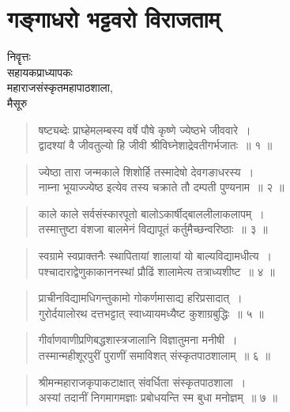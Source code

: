 \chapter{गङ्गाधरो भट्टवरो विराजताम्}

\begin{center}
\smallskip

निवॄत्तः\\ 
सहायकप्राध्यापकः\\ 
महाराजसंस्कृतमहापाठशाला,\\ 
मैसूरु
\addrule
\end{center}

\begin{verse}
षष्ट्यब्देः प्राघ्हेमलम्बस्य वर्षे पौषे कृष्णे ज्येष्ठभे जीववारे~।\\
द्वादश्यां वै जीवतुल्यो हि जीवी श्रीविघ्नेशाद्रेवतीगर्भजातः~॥ १ ॥
\end{verse}

\begin{verse}
ज्येष्ठा तारा जन्मकाले शिशोर्हि तस्मादेषो देवगङाधरस्य~।\\
नाम्ना भूयाज्ज्येष्ठ इत्येव तस्य चक्राते तौ दम्पती पुण्यनाम~॥ २ ॥
\end{verse}

\begin{verse}
काले काले सर्वसंस्कारपूतो बालोऽकार्षीद्बाललीलाकलापम्~।\\
तस्मात्तुष्टा वंशजा बालमेनं विद्यापूतं कर्तुमैच्छन्वरिष्ठाः~॥ ३ ॥
\end{verse}

\begin{verse}
स्वग्रामे स्वप्राक्तनैः स्थापितायां शालायां यो बाल्यविद्यामधीत्य~।\\
पश्चादाराद्वेणुकाकाननस्थां प्रौढिं शालामेत्य तत्राध्यशीष्ट~॥ ४ ॥
\end{verse}

\begin{verse}
प्राचीनविद्यामधिगन्तुकामो गोकर्णमासाद्य हरिप्रसादात्~।\\
गुरोर्दयालोरथ दत्तभट्टात् स्वाध्यायमध्यैष्ट कुशाग्रबुद्धिः~॥ ५ ॥
\end{verse}

\begin{verse}
गीर्वाणवाणीप्रणिबद्धशास्त्रजालानि विज्ञातुमना मनीषी~।\\
तस्मान्महीशूरपुरीं पुराणीं समाविशत् संस्कृतपाठशालाम्~॥ ६ ॥
\end{verse}

\begin{verse}
श्रीमन्महाराजकृपाकटाक्षात् संवर्धिता संस्कृतपाठशाला~।\\
अस्यां तदानीं निगमागमज्ञाः प्रबोधयन्ति स्म बुधा मनोज्ञम्~॥ ७ ॥
\end{verse}

